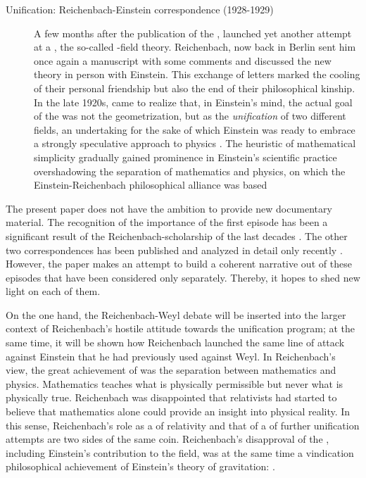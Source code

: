 \documentclass[final]{article}
\newcommand{\PRZL}{\citetitle{Reichenbach1928}\xspace}
\newcommand{\FP}{\german{Fernparallelismus}\xspace}
\begin{document}
\begin{description}
\item[Unification: Reichenbach-Einstein correspondence (1928-1929)]\label{reichenbacheinsteinII}  A few months after the publication of the \PRZL \citep{Reichenbach1928}, \citet{Einstein19281,Einstein19282} launched yet another attempt at a \uft, the so-called \FP-field theory. Reichenbach, now back in Berlin sent him once again a manuscript with some comments \citep{Reichenbach1928b} and discussed the new theory in person with Einstein. This exchange of letters marked the cooling of their personal friendship but also the end of their philosophical kinship. In the late 1920s, \citet{Reichenbach1929a,Reichenbach1929b,Reichenbach1929c} came to realize that, in Einstein's mind, the actual goal of the \uftp was not the geometrization, but as the \emph{unification} of two different fields, an undertaking for the sake of which Einstein was ready to embrace a strongly speculative approach to physics \citep{Dongen2010}. The heuristic of mathematical simplicity gradually gained prominence in Einstein's scientific practice overshadowing the separation of mathematics and physics, on which the Einstein-Reichenbach philosophical alliance was based
\end{description}
%
The present paper does not have the ambition to provide new documentary material. The recognition of the importance of the first episode has been a significant result of the Reichenbach-scholarship of the last decades \citep{Ryckman1995,Ryckman1996}. The other two correspondences has been published and analyzed in detail only recently \citep{Giovanelli2016d,Giovanelli2022}. However, the paper makes an attempt to build a coherent narrative out of these episodes that have been considered only separately. Thereby, it hopes to shed new light on each of them. 

On the one hand, the Reichenbach-Weyl debate will be inserted into the larger context of Reichenbach's hostile attitude towards the unification program; at the same time, it will be shown how Reichenbach launched the same line of attack against Einstein that he had previously used against Weyl. In Reichenbach's view, the great achievement of \gr was the separation between mathematics and physics. Mathematics teaches what is physically permissible but never what is physically true. Reichenbach was disappointed that relativists had started to believe that mathematics alone could provide an insight into physical reality. In this sense, Reichenbach's role as a  of relativity and that of a  of further unification attempts are two sides of the same coin. Reichenbach's disapproval of the \uftp, including Einstein's contribution to the field, was at the same time a vindication philosophical achievement of Einstein's theory of gravitation:  \citep[11]{Reichenbach1929}.  
\end{document}
